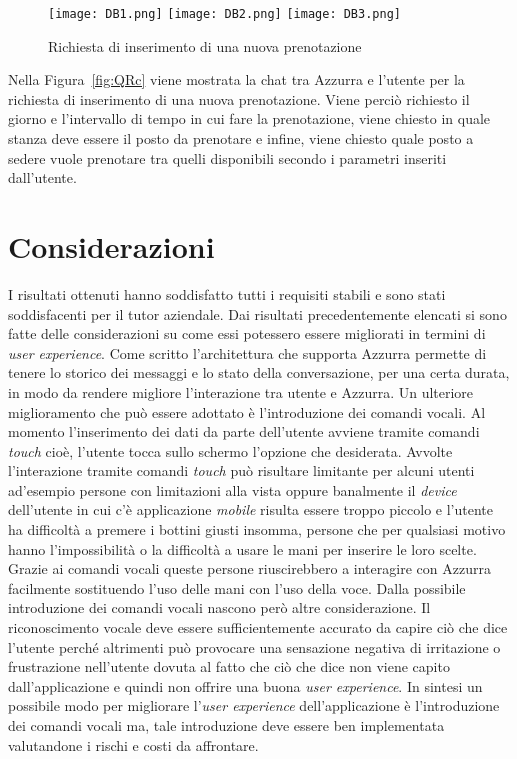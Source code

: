 \begin{figure}[h]
	\begin{center}
		\texttt{[image: DB1.png]}\hfill
		\texttt{[image: DB2.png]}\hfill
		\texttt{[image: DB3.png]}
		\caption{Richiesta di inserimento di una nuova prenotazione}\label{fig:DB}
	\end{center}
\end{figure}

Nella Figura~\ref{fig:QRc} viene mostrata la chat tra Azzurra e l'utente per la richiesta di inserimento di una nuova prenotazione. Viene perciò richiesto il giorno e l'intervallo di tempo in cui fare la prenotazione, viene chiesto in quale stanza deve essere il posto da prenotare e infine, viene chiesto quale posto a sedere vuole prenotare tra quelli disponibili secondo i parametri inseriti dall'utente.

\section{Considerazioni}
I risultati ottenuti hanno soddisfatto tutti i requisiti stabili e sono stati soddisfacenti per il tutor aziendale. Dai risultati precedentemente elencati si sono fatte delle considerazioni su come essi potessero essere migliorati in termini di \emph{user experience}. Come scritto l'architettura che supporta Azzurra permette di tenere lo storico dei messaggi e lo stato della conversazione, per una certa durata, in modo da rendere migliore l'interazione tra utente e Azzurra. Un ulteriore miglioramento che può essere adottato è l'introduzione dei comandi vocali. Al momento l'inserimento dei dati da parte dell'utente avviene tramite comandi \emph{touch} cioè, l'utente tocca sullo schermo l'opzione che desiderata. Avvolte l'interazione tramite comandi \emph{touch} può risultare limitante per alcuni utenti ad'esempio persone con limitazioni alla vista oppure banalmente il \emph{device} dell'utente in cui c'è applicazione \emph{mobile} risulta essere troppo piccolo e l'utente ha difficoltà a premere i bottini giusti insomma, persone che per qualsiasi motivo hanno l'impossibilità o la difficoltà a usare le mani per inserire le loro scelte. Grazie ai comandi vocali queste persone riuscirebbero a interagire con Azzurra facilmente sostituendo l'uso delle mani con l'uso della voce. Dalla possibile introduzione dei comandi vocali nascono però altre considerazione. Il riconoscimento vocale deve essere sufficientemente accurato da capire ciò che dice l'utente perché altrimenti può provocare una sensazione negativa di irritazione o frustrazione nell'utente dovuta al fatto che ciò che dice non viene capito dall'applicazione e quindi non offrire una buona \emph{user experience}. In sintesi un possibile modo per migliorare l'\emph{user experience} dell'applicazione è l'introduzione dei comandi vocali ma, tale introduzione deve essere ben implementata valutandone i rischi e costi da affrontare.

